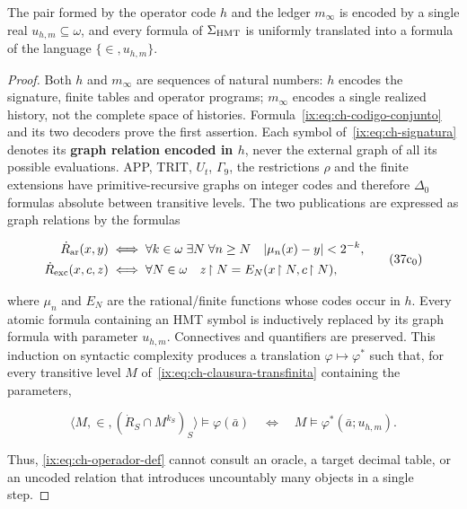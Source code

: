 \begin{lemma}
\label{ix:thm:ch-6}
The pair formed by the operator code \(h\) and the ledger \(m_\infty\) is
encoded by a single real \(u_{h,m}\subseteq\omega\), and every formula of
\(\Sigma_{\rm HMT}\) is uniformly translated into a formula of the language
\(\{\in,u_{h,m}\}\).

\end{lemma}
\begin{proof}
Both \(h\) and \(m_\infty\) are sequences of natural numbers: \(h\)
encodes the signature, finite tables and operator programs;
\(m_\infty\) encodes a single realized history, not the complete space of
histories. Formula~\eqref{ix:eq:ch-codigo-conjunto} and its two decoders prove the first
assertion. Each symbol of~\eqref{ix:eq:ch-signatura} denotes its \textbf{graph relation encoded in \(h\)}, never the external graph of all its possible evaluations. APP,
TRIT, \(U_t\), \(\Gamma_9\), the restrictions \(\rho\) and the finite
extensions have primitive-recursive graphs on integer codes and therefore
\(\Delta_0\) formulas absolute between transitive levels. The two
publications are expressed as graph relations by the formulas

\[
 \begin{aligned}
 \dot R_{\rm ar}(x,y)
 &\;\Longleftrightarrow\;
 \forall k\in\omega\;\exists N\;\forall n\ge N\quad
 |\mu_n(x)-y|<2^{-k},\\
 \dot R_{\rm exc}(x,c,z)
 &\;\Longleftrightarrow\;
 \forall N\in\omega\quad z\!\upharpoonright N
   =E_N(x\!\upharpoonright N,c\!\upharpoonright N),
 \end{aligned}
\tag{37c$_0$}\label{ix:eq:ch-grafos-publicacion}
\]

where \(\mu_n\) and \(E_N\) are the rational/finite functions whose codes
occur in \(h\). Every atomic formula containing an HMT symbol is inductively
replaced by its graph formula with parameter \(u_{h,m}\). Connectives and
quantifiers are preserved. This induction on syntactic complexity produces a
translation \(\varphi\mapsto\varphi^*\) such that, for every transitive level
\(M\) of~\eqref{ix:eq:ch-clausura-transfinita} containing the parameters,

\[
 \langle M,\in,(\dot R_S\cap M^{k_S})_S\rangle
   \models\varphi(\bar a)
 \quad\Longleftrightarrow\quad
 M\models\varphi^*(\bar a;u_{h,m}).
\tag{37c}\label{ix:eq:ch-eliminacion-uniforme}
\]

Thus, \eqref{ix:eq:ch-operador-def} cannot consult an oracle, a target decimal
table, or an uncoded relation that introduces uncountably many objects in a
single step.
\end{proof}

